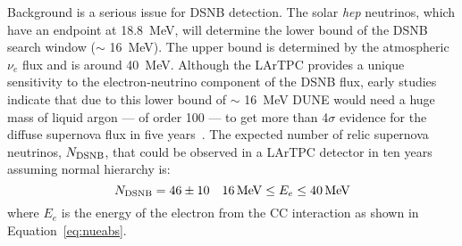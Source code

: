 Background is a serious issue for DSNB detection.
The solar {\em hep} neutrinos, which have an                
endpoint at \SI{18.8}{\MeV}, will determine the lower bound of the DSNB
search window ($\sim$ \SI{16}{\MeV}).  The upper bound is determined
by the atmospheric ${\nu}_{e}$ flux and
is around \SI{40}{MeV}.
Although the LArTPC provides a unique sensitivity to the
electron-neutrino component of the DSNB flux, early studies indicate
that due to this lower bound of $\sim$ \SI{16}{\MeV} DUNE would need a huge
mass of liquid argon --- of order \SI{100}{\kt} --- to get more than 4$\sigma$
evidence for the diffuse supernova flux in five
years~\cite{Cocco:2004ac}.
%
The expected number of relic
supernova neutrinos, $N_{\rm DSNB}$, that could be observed in a
 LArTPC detector in ten years~\cite{Cocco:2004ac}
assuming normal hierarchy is:
\begin{equation}
N_{\rm DSNB} = 46 \pm 10  \ \ \ 16 \, {\rm MeV} \leq E_e \leq 40 \, {\rm MeV}
\label{eqn:srnrate}
\end{equation}
where $E_e$ is the energy of the electron from the CC interaction as
shown in Equation~\ref{eq:nueabs}. 


